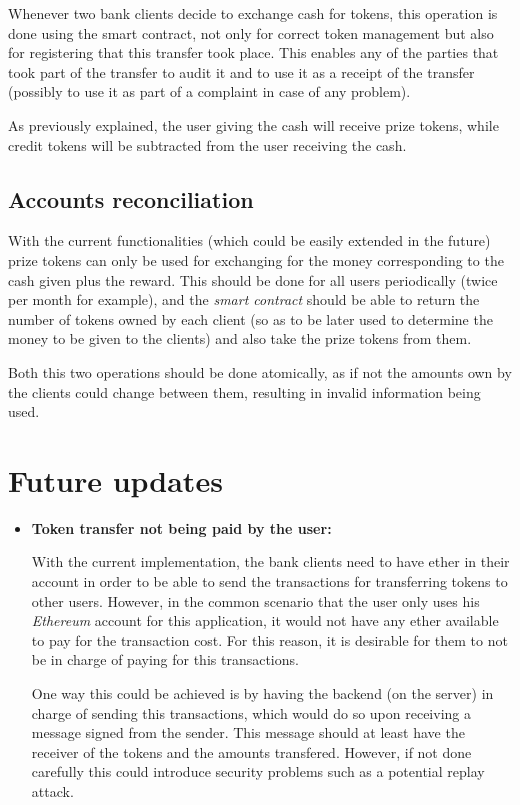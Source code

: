 \documentclass[a4paper]{article}
\begin{document}
Whenever two bank clients decide to exchange cash for tokens, this operation is done using the smart contract, not only for correct token management but also for registering that this transfer took place. This enables any of the parties that took part of the transfer to audit it and to use it as a receipt of the transfer (possibly to use it as part of a complaint in case of any problem).

As previously explained, the user giving the cash will receive prize tokens, while credit tokens will be subtracted from the user receiving the cash.

\subsection{Accounts reconciliation}

With the current functionalities (which could be easily extended in the future) prize tokens can only be used for exchanging for the money corresponding to the cash given plus the reward. This should be done for all users periodically (twice per month for example), and the \textit{smart contract} should be able to return the number of tokens owned by each client (so as to be later used to determine the money to be given to the clients) and also take the prize tokens from them.

Both this two operations should be done atomically, as if not the amounts own by the clients could change between them, resulting in invalid information being used.

\section{Future updates}

\begin{itemize}
\item \textbf{Token transfer not being paid by the user:}

	With the current implementation, the bank clients need to have ether in their account in order to be able to send the transactions for transferring tokens to other users. However, in the common scenario that the user only uses his \textit{Ethereum} account for this application, it would not have any ether available to pay for the transaction cost. For this reason, it is desirable for them to not be in charge of paying for this transactions.

    One way this could be achieved is by having the backend (on the server) in charge of sending this transactions, which would do so upon receiving a message signed from the sender. This message should at least have the receiver of the tokens and the amounts transfered. However, if not done carefully this could introduce security problems such as a potential replay attack.
\end{itemize}
\end{document}
